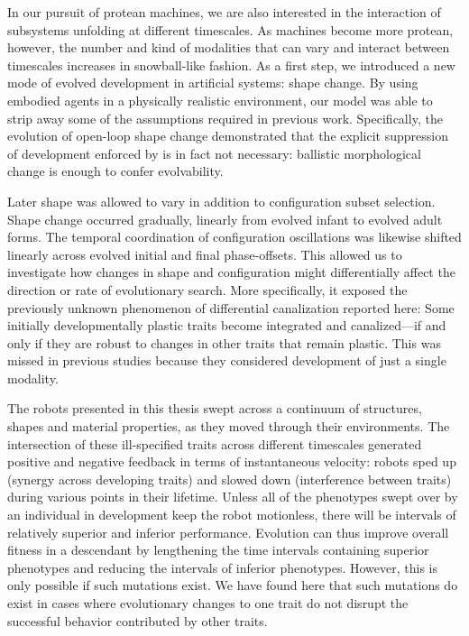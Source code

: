 In our pursuit of 
protean machines,
we are also interested in the interaction of subsystems unfolding at different timescales.
As machines become more protean, however, the  number and kind of modalities that can vary and interact between timescales increases in snowball-like fashion.
As a first step,
we introduced
a new mode of evolved development in artificial systems: shape change.
By using embodied agents in a physically realistic environment,
our model was able to strip away some of the assumptions required in previous work.
Specifically,
the evolution of open-loop shape change demonstrated that the explicit suppression of development enforced by \citet{hinton1987learning} 
is in fact not necessary: ballistic morphological change is enough to confer evolvability.


Later shape was allowed to vary in addition to configuration subset selection.
Shape change occurred gradually, linearly from evolved infant to evolved adult forms.
The temporal coordination of configuration oscillations was likewise shifted linearly across evolved initial and final phase-offsets.
This allowed us to investigate how changes in shape and configuration might differentially affect the direction or rate of evolutionary search.
More specifically, it exposed the previously unknown phenomenon of differential canalization reported here:
Some initially developmentally plastic traits become integrated and canalized---if and only if they are robust to changes in other traits that remain plastic.
This was missed in previous studies because they considered development of just a single modality.

The robots presented in this thesis 
swept across a continuum of structures, shapes and material properties,
as they
moved through their environments.
The intersection of these ill-specified traits across different timescales generated positive and negative feedback in terms of instantaneous velocity: 
robots sped up (synergy across developing traits) and slowed down (interference between traits) during various points in their lifetime.
Unless all of the phenotypes swept over by an individual in development keep the robot motionless, there will be intervals of relatively superior and inferior performance.
Evolution can thus improve overall fitness in a descendant by lengthening the time intervals containing superior phenotypes and reducing the intervals of inferior phenotypes. 
However, this is only possible if such mutations exist.
We have found here that such mutations do exist in cases where evolutionary changes
to one trait do not disrupt the successful behavior contributed
by other traits.

